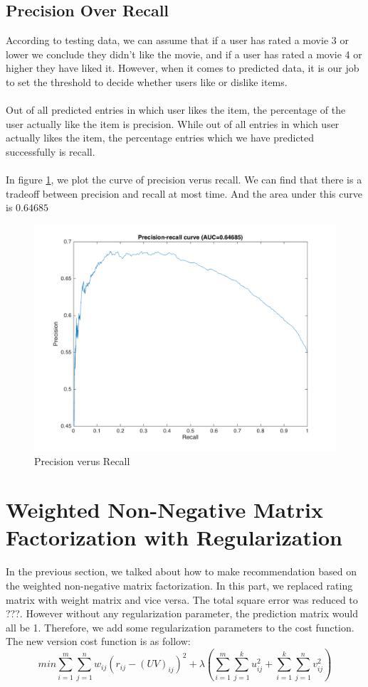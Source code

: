 \documentclass{article}
\begin{document}
\subsection{Precision Over Recall}
According to testing data, we can assume that if a user has rated a movie 3 or lower we conclude they didn't like the movie, and if a user has rated a movie 4 or higher they have liked it. However, when it comes to predicted data, it is our job to set the threshold to decide whether users like or dislike items.\\
\\
Out of all predicted entries in which user likes the item, the percentage of the user actually like the item is precision. While out of all entries in which user actually likes the item, the percentage entries which we have predicted successfully is recall.\\
\\
In figure \ref{fig:problem3}, we plot the curve of precision verus recall. We can find that there is a tradeoff between precision and recall at most time. And the area under this curve is $0.64685$
\begin{figure}[htbp]
\centering
\includegraphics[width=.6\textwidth]{problem3.png}
\caption{Precision verus Recall}
\label{fig:problem3}
\end{figure}

\section{Weighted Non-Negative Matrix Factorization with Regularization}
In the previous section, we talked about how to make recommendation based on the weighted non-negative matrix factorization. In this part, we replaced rating matrix with weight matrix and vice versa. The total square error was reduced to ???. However without any regularization parameter, the prediction matrix would all be 1. Therefore, we add some regularization parameters to the cost function. The new version cost function is as follow:
\begin{equation*}
min\sum_{i=1}^{m}\sum_{j=1}^{n}w_{ij}{(r_{ij}-{(UV)}_{ij})}^2 + \lambda\left( \sum_{i=1}^m\sum_{j=1}^ku_{ij}^2+\sum_{i=1}^k\sum_{j=1}^nv_{ij}^2\right) 
\end{equation*}
\end{document}
